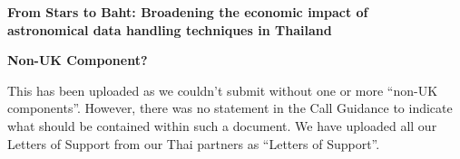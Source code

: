 \documentclass[11pt]{article}
\begin{document}
    \setcounter{figure}{0}
    \noindent
    {\LARGE \bf From Stars to Baht: Broadening the economic impact of \\
    astronomical data handling techniques in Thailand}
    
    \vspace{3mm}
    \noindent
    {\LARGE \bf Non-UK Component?}
    
    \vspace{3mm}
    \noindent
    This has been uploaded as we couldn't submit without one or more ``non-UK components''. However, there was no statement in the Call Guidance to indicate what should be contained within such a document. We have uploaded all our Letters of Support from our Thai partners as ``Letters of Support''.
\end{document}
